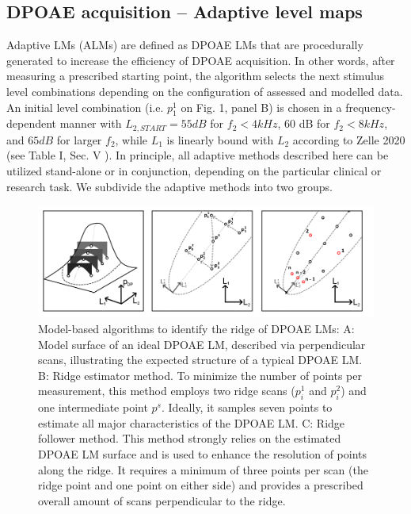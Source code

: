 \documentclass[journal,twoside,web]{ieeecolor2}
\begin{document}
\subsection{DPOAE acquisition – Adaptive level maps}
Adaptive LMs (ALMs) are defined as DPOAE LMs that are procedurally generated to increase the efficiency of DPOAE acquisition. In other words, after measuring a prescribed starting point, the algorithm selects the next stimulus level combinations depending on the configuration of assessed and modelled data. An initial level combination (i.e. $p_1^1$ on Fig. 1, panel B) is chosen in a frequency-dependent manner with $L_{2,START} = 55 dB$ for $f_2 < 4 kHz$, 60 dB for $f_2 < 8 kHz$, and $65 dB$ for larger $f_2$, while $L_1$ is linearly bound with $L_2$ according to Zelle 2020 (see Table I, Sec. V ).  In principle, all adaptive methods described here can be utilized stand-alone or in conjunction, depending on the particular clinical or research task. We subdivide the adaptive methods into two groups.

\begin{figure}
\includegraphics[width=\textwidth]{Fig_ALM_ModelBased} %
\caption{Model-based algorithms to identify the ridge of DPOAE LMs: A: Model surface of an ideal DPOAE LM, described via perpendicular scans, illustrating the expected structure of a typical DPOAE LM. B: Ridge estimator method. To minimize the number of points per measurement, this method employs two ridge scans ($p^1_i$ and $p^2_i$) and one intermediate point $p^s$. Ideally, it samples seven points to estimate all major characteristics of the DPOAE LM. C: Ridge follower method. This method strongly relies on the estimated DPOAE LM surface and is used to enhance the resolution of points along the ridge. It requires a minimum of three points per scan (the ridge point and one point on either side) and provides a prescribed overall amount of scans perpendicular to the ridge.}
\label{fig_AMB}
\end{figure}
\end{document}

